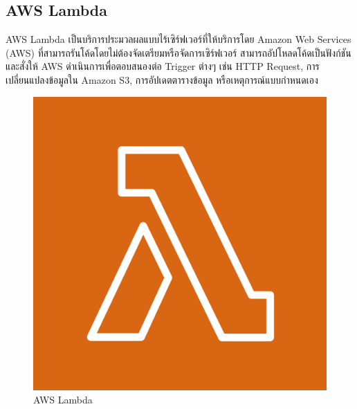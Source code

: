 \subsection{AWS Lambda}
AWS Lambda เป็นบริการประมวลผลแบบไร้เซิร์ฟเวอร์ที่ให้บริการโดย Amazon Web Services (AWS) ที่สามารถรันโค้ดโดยไม่ต้องจัดเตรียมหรือจัดการเซิร์ฟเวอร์ สามารถอัปโหลดโค้ดเป็นฟังก์ชัน และสั่งให้ AWS ดำเนินการเพื่อตอบสนองต่อ Trigger ต่างๆ เช่น HTTP Request, การเปลี่ยนแปลงข้อมูลใน Amazon S3, การอัปเดตตารางข้อมูล หรือเหตุการณ์แบบกำหนดเอง
\begin{figure}[ht]
  \centering
  \includegraphics[scale=0.05]{images/tech/aws_lambda.png}
  \caption{AWS Lambda}
  \label{fig:aws-lambda}
\end{figure}
\FloatBarrier